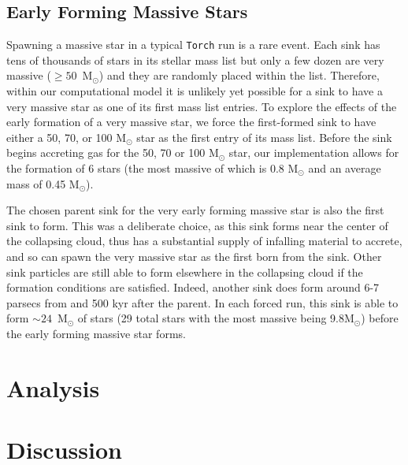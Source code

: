\documentclass[twoside]{drexel-thesis}
\begin{document}
\begin{thesis}
\subsection{Early Forming Massive Stars}
Spawning a massive star in a typical \texttt{Torch} run is a rare event. Each sink has tens of thousands of stars in its stellar mass list but only a few dozen are very massive ($\ge50$~M$_{\odot}$) and they are randomly placed within the list. Therefore, within our computational model it is unlikely yet possible for a sink to have a very massive star as one of its first mass list entries. To explore the effects of the early formation of a very massive star, we force the first-formed sink to have either a 50, 70, or 100 M$_{\odot}$ star as the first entry of its mass list. 
Before the sink begins accreting gas for the 50, 70 or 100 M$_{\odot}$ star, our implementation allows for the formation of 6 stars (the most massive of which is 0.8 M$_\odot$ and an average mass of 0.45 M$_\odot$). 

The chosen parent sink for the very early forming massive star is also the first sink to form. This was a deliberate choice, as this sink forms near the center of the collapsing cloud, thus has a substantial supply of infalling material to accrete, and so can spawn the very massive star as the first born from the sink. Other sink particles are still able to form elsewhere in the collapsing cloud if the formation conditions are satisfied. Indeed, another sink does form around 6-7 parsecs from and 500 kyr after the parent. In each forced run, this sink is able to form $\sim24$~M$_\odot$ of stars (29 total stars with the most massive being 9.8M$_\odot$) before the early forming massive star forms.

\section{Analysis}\label{sec:p1-analysis}


\section{Discussion}\label{sec:p1-discussion}


\end{thesis}
\end{document}
